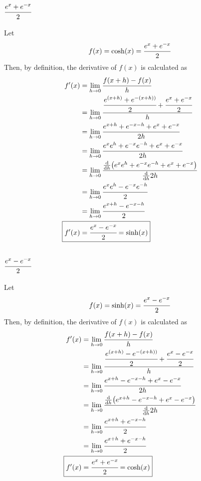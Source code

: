 \documentclass[]{article}
\begin{document}
\subsection{
    $\cfrac{e^x + e^{-x}}{2}$
}
Let
\[
    f(x) = \cosh(x) = \cfrac{e^x + e^{-x}}{2}
\]
Then, by definition, the derivative of $f(x)$ is calculated as
\begin{align*}
    f'(x) 
    &= \lim_{h \to 0} \cfrac{f(x + h) - f(x)}{h}\\
    &= \lim_{h \to 0} 
        \cfrac{
            \cfrac{e^{(x+h)} + e^{-(x + h))}}{2} + \cfrac{e^x + e^{-x}}{2}
            }{h}\\
    &= \lim_{h \to 0}
        \cfrac{
            e^{x + h} + e^{-x - h} + e^{x} + e^{-x}
        }{
            2 h
        }\\
    &= \lim_{h \to 0}
        \cfrac{
            e^{x} e^{h} + e^{-x} e^{-h} + e^{x} + e^{-x}
        }{
            2 h
        }\\
    &= \lim_{h \to 0}
        \cfrac{
            \dv{h} \qty(e^{x} e^{h} + e^{-x} e^{-h} + e^{x} + e^{-x})
        }{
            \dv{h} 2 h
        }\\
    &= \lim_{h \to 0}
        \cfrac{
            e^{x} e^{h} - e^{-x} e^{-h}
        }{
            2
        }\\
    &= \lim_{h \to 0}
        \cfrac{
            e^{x + h} - e^{-x - h}
        }{
            2
        }\\
    \Aboxed{
        f'(x)
        &= \cfrac{e^{x} - e^{-x}}{2} = \sinh(x)
        }
\end{align*}

\subsection{
    $\cfrac{e^x - e^{-x}}{2}$
}
Let
\[
    f(x) = \sinh(x) = \cfrac{e^x - e^{-x}}{2}
\]
Then, by definition, the derivative of $f(x)$ is calculated as
\begin{align*}
    f'(x) 
    &= \lim_{h \to 0} \cfrac{f(x + h) - f(x)}{h}\\
    &= \lim_{h \to 0} 
        \cfrac{
            \cfrac{e^{(x+h)} - e^{-(x + h))}}{2} + \cfrac{e^x - e^{-x}}{2}
            }{h}\\
    &= \lim_{h \to 0}
        \cfrac{
            e^{x + h} - e^{-x - h} + e^{x} - e^{-x}
        }{
            2 h
        }\\
    &= \lim_{h \to 0}
        \cfrac{
            \dv{h} \qty(e^{x + h} - e^{-x - h} + e^{x} - e^{-x})
        }{
            \dv{h} 2 h
        }\\
    &= \lim_{h \to 0}
        \cfrac{
            e^{x + h} + e^{-x - h}
        }{
            2
        }\\
    &= \lim_{h \to 0}
        \cfrac{
            e^{x + h} + e^{-x - h}
        }{
            2
        }\\
    \Aboxed{
        f'(x)
        &= \cfrac{e^{x} + e^{-x}}{2} = \cosh(x)
        }
\end{align*}
\end{document}
